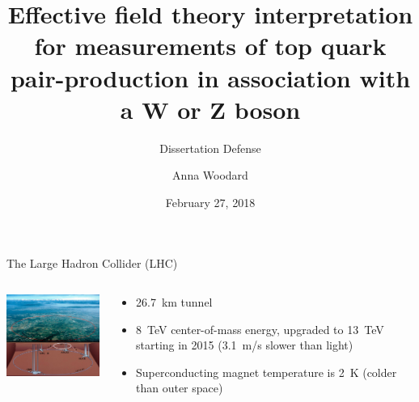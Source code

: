 \documentclass[professionalfont,fleqn]{beamer}
\author{Anna Woodard}
\date{February 27, 2018}
\title{Effective field theory interpretation for measurements of top quark
pair-production in association with a W or Z boson}
\subtitle{Dissertation Defense}
\begin{document}

\maketitle

\begin{frame}{The Large Hadron Collider (LHC)}
  \begin{columns}
    \begin{column}{.4\linewidth}
      \centering
      \includegraphics[width=5cm]{figures/LHC}
    \end{column}
    \begin{column}{.6\linewidth}
      \small
      \begin{itemize}
        \item \SI{26.7}{km} tunnel
        \item \SI{8}{TeV} center-of-mass energy, upgraded to \SI{13}{TeV} starting in 2015 (\SI{3.1}{m/s} slower than light)
        \item Superconducting magnet temperature is \SI{2}{K} (colder than outer space)
      \end{itemize}
    \end{column}
  \end{columns}
\end{frame}
\end{document}
